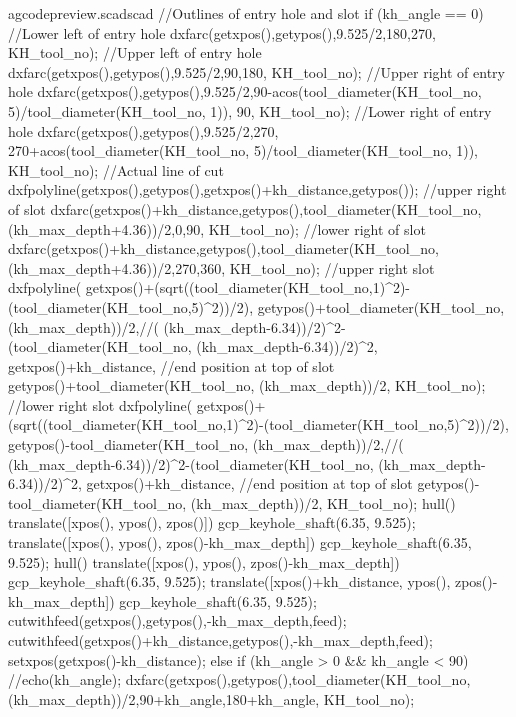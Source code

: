 \documentclass{ltxdoc}
\begin{document}
\lstset{firstnumber=1}%
\begin{writecode}{a}{gcodepreview.scad}{scad}
//Outlines of entry hole and slot
  if (kh_angle == 0) {
    //Lower left of entry hole
    dxfarc(getxpos(),getypos(),9.525/2,180,270, KH_tool_no);
    //Upper left of entry hole
    dxfarc(getxpos(),getypos(),9.525/2,90,180, KH_tool_no);
    //Upper right of entry hole
    dxfarc(getxpos(),getypos(),9.525/2,90-acos(tool_diameter(KH_tool_no, 5)/tool_diameter(KH_tool_no, 1)), 90, KH_tool_no);
    //Lower right of entry hole
    dxfarc(getxpos(),getypos(),9.525/2,270, 270+acos(tool_diameter(KH_tool_no, 5)/tool_diameter(KH_tool_no, 1)), KH_tool_no);
    //Actual line of cut
    dxfpolyline(getxpos(),getypos(),getxpos()+kh_distance,getypos());
    //upper right of slot
    dxfarc(getxpos()+kh_distance,getypos(),tool_diameter(KH_tool_no, (kh_max_depth+4.36))/2,0,90, KH_tool_no);
    //lower right of slot
    dxfarc(getxpos()+kh_distance,getypos(),tool_diameter(KH_tool_no, (kh_max_depth+4.36))/2,270,360, KH_tool_no);
    //upper right slot
    dxfpolyline(
        getxpos()+(sqrt((tool_diameter(KH_tool_no,1)^2)-(tool_diameter(KH_tool_no,5)^2))/2), 
        getypos()+tool_diameter(KH_tool_no, (kh_max_depth))/2,//( (kh_max_depth-6.34))/2)^2-(tool_diameter(KH_tool_no, (kh_max_depth-6.34))/2)^2,
        getxpos()+kh_distance,
    //end position at top of slot
        getypos()+tool_diameter(KH_tool_no, (kh_max_depth))/2, 
        KH_tool_no);
    //lower right slot
    dxfpolyline(
        getxpos()+(sqrt((tool_diameter(KH_tool_no,1)^2)-(tool_diameter(KH_tool_no,5)^2))/2), 
        getypos()-tool_diameter(KH_tool_no, (kh_max_depth))/2,//( (kh_max_depth-6.34))/2)^2-(tool_diameter(KH_tool_no, (kh_max_depth-6.34))/2)^2,
        getxpos()+kh_distance,
    //end position at top of slot
        getypos()-tool_diameter(KH_tool_no, (kh_max_depth))/2, 
        KH_tool_no);
    hull(){
      translate([xpos(), ypos(), zpos()]){
        gcp_keyhole_shaft(6.35, 9.525);
      }
      translate([xpos(), ypos(), zpos()-kh_max_depth]){
        gcp_keyhole_shaft(6.35, 9.525);
      }
    }
    hull(){
      translate([xpos(), ypos(), zpos()-kh_max_depth]){
        gcp_keyhole_shaft(6.35, 9.525);
      }
      translate([xpos()+kh_distance, ypos(), zpos()-kh_max_depth]){
        gcp_keyhole_shaft(6.35, 9.525);
      }
    }
    cutwithfeed(getxpos(),getypos(),-kh_max_depth,feed);
    cutwithfeed(getxpos()+kh_distance,getypos(),-kh_max_depth,feed);
    setxpos(getxpos()-kh_distance);
  } else if (kh_angle > 0 && kh_angle < 90) {
//echo(kh_angle);
  dxfarc(getxpos(),getypos(),tool_diameter(KH_tool_no, (kh_max_depth))/2,90+kh_angle,180+kh_angle, KH_tool_no);
}
\end{writecode}
\end{document}
